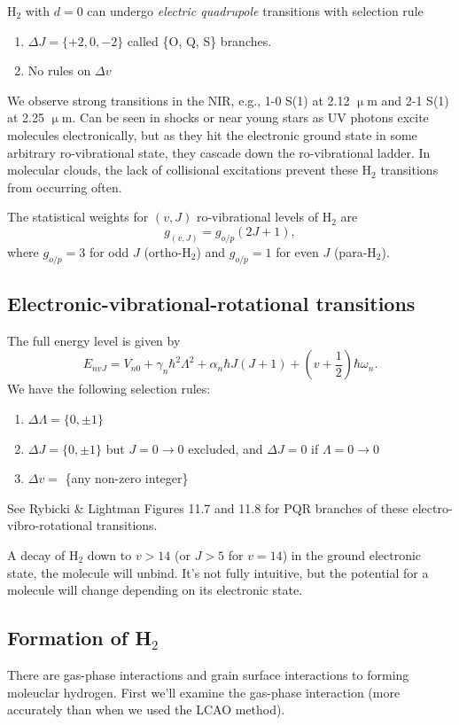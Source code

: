 \documentclass{tufte-handout}
\newcommand{\m}{\upmu} %
\newcommand{\um}{$\m{}$m}
\begin{document}
H$_2$ with $d=0$ can undergo \textit{electric quadrupole} transitions with selection rule
\begin{enumerate}
\item $\Delta J = \{+2, 0, -2\}$ called \{O, Q, S\} branches.
\item No rules on $\Delta v$
\end{enumerate}
We observe strong transitions in the NIR, e.g., 1-0 S(1) at 2.12 \um{} and 2-1 S(1) at 2.25 \um. Can be seen in shocks or near young stars as UV photons excite molecules electronically, but as they hit the electronic ground state in some arbitrary ro-vibrational state, they cascade down the ro-vibrational ladder. In molecular clouds, the lack of collisional excitations prevent these H$_2$ transitions from occurring often.

The statistical weights for $(v,J)$ ro-vibrational levels of H$_2$ are 
\[g_{(v,J)} = g_{o/p}(2J+1),\]
where $g_{o/p} = 3$ for odd $J$ (ortho-H$_2$) and $g_{o/p} = 1$ for even $J$ (para-H$_2$).

\subsection{Electronic-vibrational-rotational transitions}
The full energy level is given by
\begin{equation}
E_{nvJ} = V_{n0} + \gamma_n \hbar^2 \Lambda^2 + \alpha_n \hbar J(J+1) + \left (v+\frac{1}{2}\right ) \hbar \omega_n.
\end{equation}
We have the following selection rules:
\begin{enumerate}
\item $\Delta \Lambda = \{0, \pm 1\}$
\item $\Delta J = \{0, \pm 1\}$ but $J = 0\rightarrow 0$ excluded, and $\Delta J=0$ if $\Lambda = 0\rightarrow 0$
\item $\Delta v =$ \{any non-zero integer\}
\end{enumerate}
See Rybicki \& Lightman Figures 11.7 and 11.8 for PQR branches of these electro-vibro-rotational transitions.

A decay of H$_2$ down to $v>14$ (or $J>5$ for $v=14$) in the ground electronic state, the molecule will unbind. It's not fully intuitive, but the potential for a molecule will change depending on its electronic state.

\subsection{Formation of H$_2$}
There are gas-phase interactions and grain surface interactions to forming moleuclar hydrogen. First we'll examine the gas-phase interaction (more accurately than when we used the LCAO method). 
\end{document}
